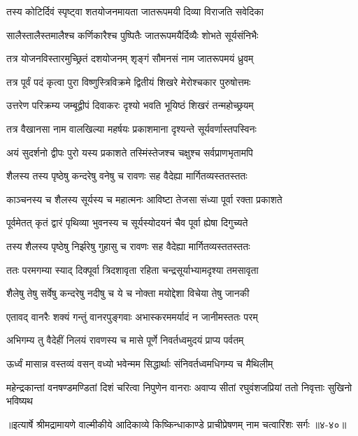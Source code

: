 \twolineshloka
{तस्य कोटिर्दिवं स्पृष्ट्वा शतयोजनमायता}
{जातरूपमयी दिव्या विराजति सवेदिका} %

\twolineshloka
{सालैस्तालैस्तमालैश्च कर्णिकारैश्च पुष्पितैः}
{जातरूपमयैर्दिव्यैः शोभते सूर्यसंनिभैः} %

\twolineshloka
{तत्र योजनविस्तारमुच्छ्रितं दशयोजनम्}
{शृङ्गं सौमनसं नाम जातरूपमयं ध्रुवम्} %

\twolineshloka
{तत्र पूर्वं पदं कृत्वा पुरा विष्णुस्त्रिविक्रमे}
{द्वितीयं शिखरे मेरोश्चकार पुरुषोत्तमः} %

\twolineshloka
{उत्तरेण परिक्रम्य जम्बूद्वीपं दिवाकरः}
{दृश्यो भवति भूयिष्ठं शिखरं तन्महोच्छ्रयम्} %

\twolineshloka
{तत्र वैखानसा नाम वालखिल्या महर्षयः}
{प्रकाशमाना दृश्यन्ते सूर्यवर्णास्तपस्विनः} %

\twolineshloka
{अयं सुदर्शनो द्वीपः पुरो यस्य प्रकाशते}
{तस्मिंस्तेजश्च चक्षुश्च सर्वप्राणभृतामपि} %

\twolineshloka
{शैलस्य तस्य पृष्ठेषु कन्दरेषु वनेषु च}
{रावणः सह वैदेह्या मार्गितव्यस्ततस्ततः} %

\twolineshloka
{काञ्चनस्य च शैलस्य सूर्यस्य च महात्मनः}
{आविष्टा तेजसा संध्या पूर्वा रक्ता प्रकाशते} %

\twolineshloka
{पूर्वमेतत् कृतं द्वारं पृथिव्या भुवनस्य च}
{सूर्यस्योदयनं चैव पूर्वा ह्येषा दिगुच्यते} %

\twolineshloka
{तस्य शैलस्य पृष्ठेषु निर्झरेषु गुहासु च}
{रावणः सह वैदेह्या मार्गितव्यस्ततस्ततः} %

\twolineshloka
{ततः परमगम्या स्याद् दिक्पूर्वा त्रिदशावृता}
{रहिता चन्द्रसूर्याभ्यामदृश्या तमसावृता} %

\twolineshloka
{शैलेषु तेषु सर्वेषु कन्दरेषु नदीषु च}
{ये च नोक्ता मयोद्देशा विचेया तेषु जानकी} %

\twolineshloka
{एतावद् वानरैः शक्यं गन्तुं वानरपुङ्गवाः}
{अभास्करममर्यादं न जानीमस्ततः परम्} %

\twolineshloka
{अभिगम्य तु वैदेहीं निलयं रावणस्य च}
{मासे पूर्णे निवर्तध्वमुदयं प्राप्य पर्वतम्} %

\twolineshloka
{ऊर्ध्वं मासान्न वस्तव्यं वसन् वध्यो भवेन्मम}
{सिद्धार्थाः संनिवर्तध्वमधिगम्य च मैथिलीम्} %

\twolineshloka
{महेन्द्रकान्तां वनषण्डमण्डितां दिशं चरित्वा निपुणेन वानराः}
{अवाप्य सीतां रघुवंशजप्रियां ततो निवृत्ताः सुखिनो भविष्यथ} %


॥इत्यार्षे श्रीमद्रामायणे वाल्मीकीये आदिकाव्ये किष्किन्धाकाण्डे प्राचीप्रेषणम् नाम चत्वारिंशः सर्गः ॥४-४०॥
